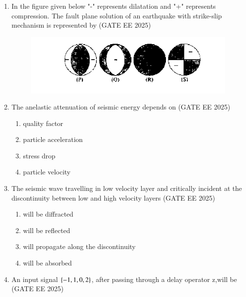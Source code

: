 \documentclass[journal]{IEEEtran}
\begin{document}
\begin{enumerate}[start=26]
\item In the figure given below "-" represents dilatation and "+" represents compression. The fault plane solution of an earthquake with strike-slip mechanism is represented by
\hfill{(GATE EE 2025)}
\begin{figure}[H]
    \centering
    \includegraphics[width=0.5\linewidth]{figs/Screenshot from 2025-08-07 18-03-55.png} 
    \caption{}
    \label{fig:}
\end{figure}
\begin{enumerate}
\end{enumerate}

\item  The anelastic attenuation of seismic energy depends on
\hfill{(GATE EE 2025)}
\begin{enumerate}
    \item  quality factor
\item  particle acceleration
\item stress drop
\item  particle velocity
\end{enumerate}
 \item The seismic wave travelling in low velocity layer and critically incident at the discontinuity between low and high velocity layers
 \hfill{(GATE EE 2025)}
\begin{enumerate}
    \item  will be diffracted
\item  will be reflected
\item  will propagate along the discontinuity
\item will be absorbed
\end{enumerate}

\item An input signal $\left\{-1,1,0,2\right\}$, after passing through a delay operator z,will be\\
\hfill{(GATE EE 2025)}
\begin{enumerate}


\end{enumerate}
\end{enumerate}
\end{document}
